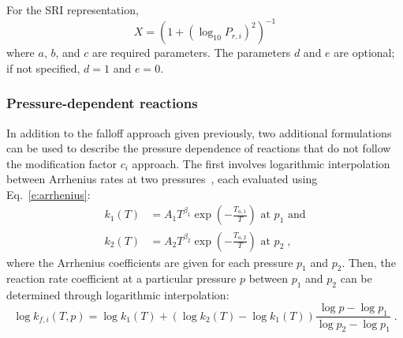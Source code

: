 \documentclass[preprint,12pt]{elsarticle}
\begin{document}
For the SRI representation,
\begin{equation}
X = \left( 1 + \left( \log_{10} P_{r,i} \right)^2 \right)^{-1}
\end{equation}
where $a$, $b$, and $c$ are required parameters. The parameters $d$ and $e$ are optional; if not specified, $d = 1$ and $e = 0$.

\subsubsection{Pressure-dependent reactions}

In addition to the falloff approach given previously, two additional formulations can be used to describe the pressure dependence of reactions that do not follow the modification factor $c_i$ approach.
The first involves logarithmic interpolation between Arrhenius rates at two pressures~\cite{chemkin:2012,Goodwin:2014aa}, each evaluated using Eq.~\eqref{e:arrhenius}:
\begin{align}
k_1 (T) &= A_1 T^{\beta_1} \exp \left( -\frac{T_{a, 1}}{T} \right) \text{ at } p_1 \text{ and} \label{e:plog_k1} \\
k_2 (T) &= A_2 T^{\beta_2} \exp \left( -\frac{T_{a, 2}}{T} \right) \text{ at } p_2 \;, \label{e:plog_k2}
\end{align}
where the Arrhenius coefficients are given for each pressure $p_1$ and $p_2$.
Then, the reaction rate coefficient at a particular pressure $p$ between $p_1$ and $p_2$ can be determined through logarithmic interpolation:
\begin{equation}
\log k_{f,i}(T, p) = \log k_1 (T) + \left( \log k_2 (T) - \log k_1 (T) \right) \frac{\log p - \log p_1}{\log p_2 - \log p_1} \;. \label{e:plog}
\end{equation}
\end{document}
